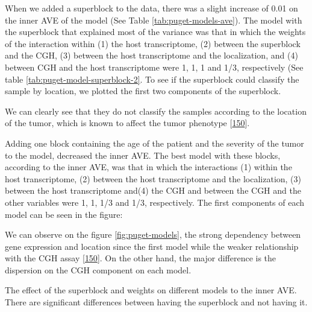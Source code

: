 \documentclass[
  a4paper,
]{book}
\begin{document}
When we added a superblock to the data, there was a slight increase of 0.01 on the inner AVE of the model (See Table \ref{tab:puget-models-ave}).
The model with the superblock that explained most of the variance was that in which the weights of the interaction within (1) the host transcriptome, (2) between the superblock and the CGH, (3) between the host transcriptome and the localization, and (4) between CGH and the host transcriptome were 1, 1, 1 and 1/3, respectively (See table \ref{tab:puget-model-superblock-2}.
To see if the superblock could classify the sample by location, we plotted the first two components of the superblock.

We can clearly see that they do not classify the samples according to the location of the tumor, which is known to affect the tumor phenotype {[}\protect\hyperlink{ref-puget2012}{150}{]}.

Adding one block containing the age of the patient and the severity of the tumor to the model, decreased the inner AVE.
The best model with these blocks, according to the inner AVE, was that in which the interactions (1) within the host transcriptome, (2) between the host transcriptome and the localization, (3) between the host transcriptome and(4) the CGH and between the CGH and the other variables were 1, 1, 1/3 and 1/3, respectively.
The first components of each model can be seen in the figure:

We can observe on the figure \ref{fig:puget-models}, the strong dependency between gene expression and location since the first model while the weaker relationship with the CGH assay {[}\protect\hyperlink{ref-puget2012}{150}{]}.
On the other hand, the major difference is the dispersion on the CGH component on each model.

The effect of the superblock and weights on different models to the inner AVE.
There are significant differences between having the superblock and not having it.
\end{document}
